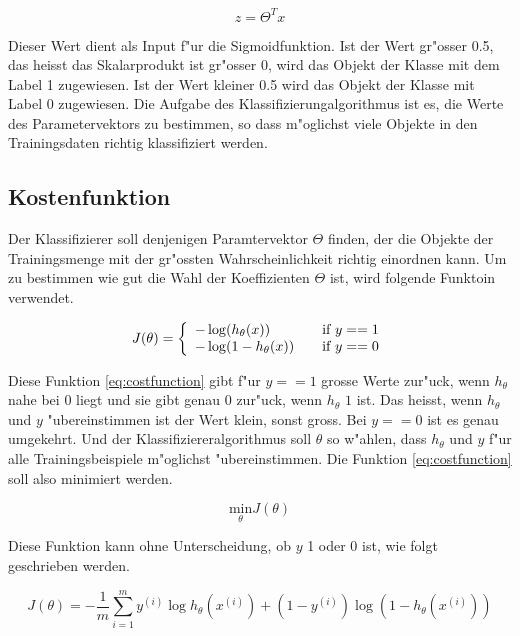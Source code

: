 \documentclass[12pt,a4paper,twoside]{article}
\begin{document}
\[
z = \Theta^T x
\]

Dieser Wert dient als Input f"ur die Sigmoidfunktion. Ist der Wert gr"osser 0.5, das heisst das Skalarprodukt ist gr"osser 0, wird das Objekt der Klasse mit dem Label 1 zugewiesen. Ist der Wert kleiner 0.5 wird das Objekt der Klasse mit Label 0 zugewiesen. Die Aufgabe des Klassifizierungalgorithmus ist es, die Werte des Parametervektors zu bestimmen, so dass m"oglichst viele Objekte in den Trainingsdaten richtig klassifiziert werden. 

\subsection{Kostenfunktion}
\label{sec:costfunction}

Der Klassifizierer soll denjenigen Paramtervektor $\Theta$ finden, der die Objekte der Trainingsmenge mit der gr"ossten Wahrscheinlichkeit richtig einordnen kann. Um zu bestimmen wie gut die Wahl der Koeffizienten $\Theta$ ist, wird folgende Funktoin verwendet.

\begin{equation}
  \label{eq:costfunction}
  J(\theta) = \left \{
    \begin{array}{l l}
      -\log(h_{\theta} (x)) & \quad \text{if $y==1$}\\
      -\log(1-h_{\theta} (x)) & \quad \text{if $y==0$}
    \end{array} \right.
\end{equation}

Diese Funktion \ref{eq:costfunction} gibt f"ur $y==1$ grosse Werte zur"uck, wenn $h_{\theta}$ nahe bei $0$ liegt und sie gibt genau $0$ zur"uck, wenn $h_{\theta}$ $1$ ist. Das heisst, wenn $h_{\theta}$ und $y$ "ubereinstimmen ist der Wert klein, sonst gross. Bei $y==0$ ist es genau umgekehrt. Und der Klassifiziereralgorithmus soll $\theta$ so w"ahlen, dass $h_{\theta}$ und $y$  f"ur alle Trainingsbeispiele m"oglichst "ubereinstimmen. Die Funktion \ref{eq:costfunction} soll also minimiert werden.

\begin{equation}
  \label{eq:minimize}
  \underset{\theta}{\text{min}} J(\theta)
\end{equation}

Diese Funktion kann ohne Unterscheidung, ob $y$ 1 oder 0 ist, wie folgt geschrieben werden. 

\begin{equation}
  \label{eq:simplecostfunction}
  J( \theta ) = - \frac{1}{m} \sum_{i=1}^m y^{(i)} \log h_{\theta}(x^{(i)}) + (1 - y^{(i)}) \log(1 - h_{\theta}(x^{(i)}))
\end{equation}
\end{document}
